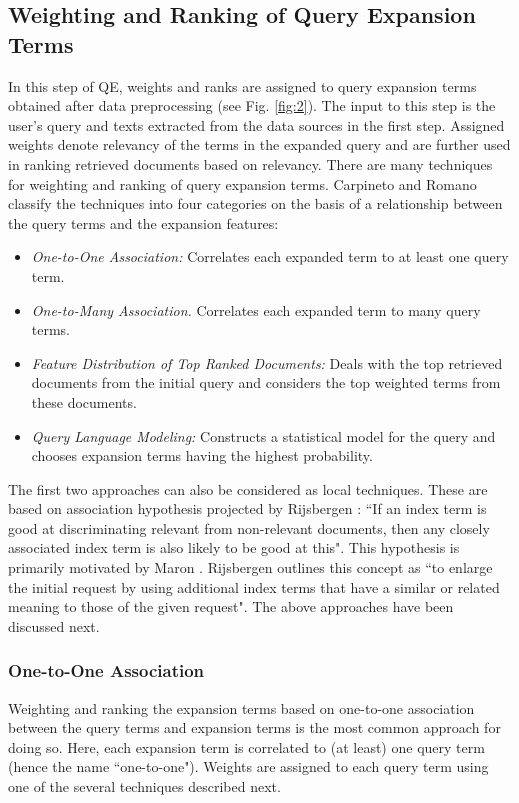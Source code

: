 \subsection{Weighting and Ranking of Query Expansion Terms}\label{wr}
In this step of QE, weights and ranks are assigned to query expansion terms obtained after data preprocessing (see Fig. \ref{fig:2}). The input to this step is the user's query and texts extracted from the data sources in the first step. Assigned weights denote relevancy of the terms in the expanded query and are further used in ranking retrieved documents based on relevancy. 
There are many techniques for weighting and ranking of query expansion terms. Carpineto and Romano \cite{carpineto2012survey} classify the techniques into four categories on the basis of a relationship between the query terms and the expansion features:
\begin{itemize}
	\item \emph{One-to-One Association:} Correlates each expanded term to at least one query term. 
	\item \emph{One-to-Many Association.} Correlates each expanded term to many query terms.
	\item \emph{Feature Distribution of Top Ranked Documents:} Deals with the top retrieved documents from the initial query and considers the top weighted terms from these documents.
	\item \emph{Query Language Modeling:} Constructs a statistical model for the query and chooses expansion terms having the highest probability.
\end{itemize}
The first two approaches can also be considered as local techniques. These are based on association hypothesis projected by Rijsbergen  \cite{Rijsbergen:1979:IR:539927}: ``If an index term is good at discriminating relevant from non-relevant documents, then any closely associated index term is also likely to be good at this". This hypothesis is primarily motivated by Maron \cite{maron1965mechanized}. Rijsbergen \cite{Rijsbergen:1979:IR:539927} outlines this concept as ``to enlarge the initial request by using additional index terms that have a similar or related meaning to those of the given request". The above approaches have been discussed next.
\subsubsection{One-to-One Association} 
Weighting and ranking the expansion terms based on one-to-one association between the query terms and expansion terms is the most common approach for doing so.  Here, each expansion term is correlated to (at least) one query term (hence the name ``one-to-one"). Weights are assigned to each query term using one of the several techniques described next.


